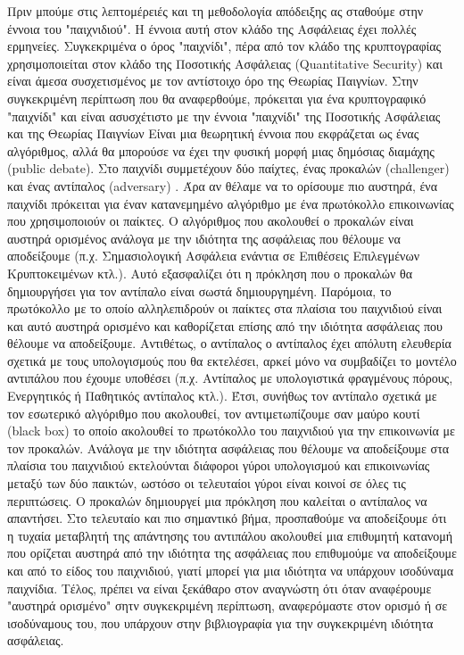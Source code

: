 Πριν μπούμε στις λεπτομέρειές και τη μεθοδολογία απόδειξης ας σταθούμε στην έννοια του "παιχνιδιού". Η έννοια αυτή στον κλάδο της Ασφάλειας έχει πολλές ερμηνείες. Συγκεκριμένα ο όρος "παιχνίδι", πέρα από τον κλάδο της κρυπτογραφίας χρησιμοποιείται στον κλάδο της Ποσοτικής Ασφάλειας (Quantitative Security) και είναι άμεσα συσχετισμένος με τον αντίστοιχο όρο της Θεωρίας Παιγνίων. Στην συγκεκριμένη περίπτωση που θα αναφερθούμε, πρόκειται για ένα κρυπτογραφικό "παιχνίδι" και είναι ασυσχέτιστο με την έννοια "παιχνίδι" της Ποσοτικής Ασφάλειας και της Θεωρίας Παιγνίων \cite{Alpcan2019} Είναι μια θεωρητική έννοια που εκφράζεται ως ένας αλγόριθμος, αλλά θα μπορούσε να έχει την φυσική μορφή μιας δημόσιας διαμάχης (public debate). Στο παιχνίδι συμμετέχουν δύο παίχτες, ένας προκαλών (challenger) \cdv και ένας αντίπαλος (adversary) \adv. Άρα αν θέλαμε να το ορίσουμε πιο αυστηρά, ένα παιχνίδι πρόκειται για έναν κατανεμημένο αλγόριθμο με ένα πρωτόκολλο επικοινωνίας που χρησιμοποιούν οι παίκτες. Ο αλγόριθμος που ακολουθεί ο προκαλών είναι αυστηρά ορισμένος ανάλογα με την ιδιότητα της ασφάλειας που θέλουμε να αποδείξουμε (π.χ. Σημασιολογική Ασφάλεια ενάντια σε Επιθέσεις Επιλεγμένων Κρυπτοκειμένων κτλ.). Αυτό εξασφαλίζει ότι η πρόκληση που ο προκαλών θα δημιουργήσει για τον αντίπαλο είναι σωστά δημιουργημένη. Παρόμοια, το πρωτόκολλο με το οποίο αλληλεπιδρούν οι παίκτες στα πλαίσια του παιχνιδιού είναι και αυτό αυστηρά ορισμένο και καθορίζεται επίσης από την ιδιότητα ασφάλειας που θέλουμε να αποδείξουμε. Αντιθέτως, ο αντίπαλος ο αντίπαλος έχει απόλυτη ελευθερία σχετικά με τους υπολογισμούς που θα εκτελέσει, αρκεί μόνο να συμβαδίζει το μοντέλο αντιπάλου που έχουμε υποθέσει (π.χ. Αντίπαλος με υπολογιστικά φραγμένους πόρους, Ενεργητικός ή Παθητικός αντίπαλος κτλ.). Έτσι, συνήθως τον αντίπαλο σχετικά με τον εσωτερικό αλγόριθμο που ακολουθεί, τον αντιμετωπίζουμε σαν μαύρο κουτί (black box) το οποίο ακολουθεί το πρωτόκολλο του παιχνιδιού για την επικοινωνία με τον προκαλών. Ανάλογα με την ιδιότητα ασφάλειας που θέλουμε να αποδείξουμε στα πλαίσια του παιχνιδιού εκτελούνται διάφοροι γύροι υπολογισμού και επικοινωνίας μεταξύ των δύο παικτών, ωστόσο οι τελευταίοι γύροι είναι κοινοί σε όλες τις περιπτώσεις. Ο προκαλών δημιουργεί μια πρόκληση που καλείται ο αντίπαλος να απαντήσει. Στο τελευταίο και πιο σημαντικό βήμα, προσπαθούμε να αποδείξουμε ότι η τυχαία μεταβλητή της απάντησης του αντιπάλου ακολουθεί μια επιθυμητή κατανομή που ορίζεται αυστηρά από την ιδιότητα της ασφάλειας που επιθυμούμε να αποδείξουμε και από το είδος του παιχνιδιού, γιατί μπορεί για μια ιδιότητα να υπάρχουν ισοδύναμα παιχνίδια. Τέλος, πρέπει να είναι ξεκάθαρο στον αναγνώστη ότι όταν αναφέρουμε "αυστηρά ορισμένο" σητν συγκεκριμένη περίπτωση, αναφερόμαστε στον ορισμό ή σε ισοδύναμους του, που υπάρχουν στην βιβλιογραφία για την συγκεκριμένη ιδιότητα ασφάλειας.

